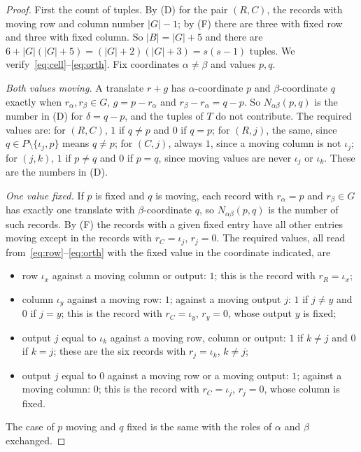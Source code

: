 \documentclass[11pt]{amsart}
\theoremstyle{definition}\newtheorem{definition}[theorem]{Definition}
\theoremstyle{remark}\newtheorem{remark}[theorem]{Remark}
\begin{document}
\begin{proof}
First the count of tuples. By (D) for the pair $(R,C)$, the records with moving row and column number $|G|-1$; by (F)
there are three with fixed row and three with fixed column. So $|B|=|G|+5$ and there are
$6+|G|(|G|+5)=(|G|+2)(|G|+3)=s(s-1)$ tuples. We verify~\eqref{eq:cell}--\eqref{eq:orth}. Fix coordinates
$\alpha\ne\beta$ and values $p,q$.

\emph{Both values moving.} A translate $r+g$ has $\alpha$-coordinate $p$ and $\beta$-coordinate $q$ exactly when
$r_\alpha,r_\beta\in G$, $g=p-r_\alpha$ and $r_\beta-r_\alpha=q-p$. So $N_{\alpha\beta}(p,q)$ is the number in (D) for
$\delta=q-p$, and the tuples of $T$ do not contribute. The required values are: for $(R,C)$, $1$ if $q\ne p$ and $0$ if
$q=p$; for $(R,j)$, the same, since $q\in P\setminus\{\iota_j,p\}$ means $q\ne p$; for $(C,j)$, always $1$, since a
moving column is not $\iota_j$; for $(j,k)$, $1$ if $p\ne q$ and $0$ if $p=q$, since moving values are never
$\iota_j$ or $\iota_k$. These are the numbers in (D).

\emph{One value fixed.} If $p$ is fixed and $q$ is moving, each record with $r_\alpha=p$ and $r_\beta\in G$ has exactly
one translate with $\beta$-coordinate $q$, so $N_{\alpha\beta}(p,q)$ is the number of such records. By (F) the
records with a given fixed entry have all other entries moving except in the records with $r_C=\iota_j$, $r_j=0$. The
required values, all read from~\eqref{eq:row}--\eqref{eq:orth} with the fixed value in the coordinate indicated, are
\begin{itemize}
\item row $\iota_x$ against a moving column or output: $1$; this is the record with $r_R=\iota_x$;
\item column $\iota_y$ against a moving row: $1$; against a moving output $j$: $1$ if $j\ne y$ and $0$ if $j=y$; this is
the record with $r_C=\iota_y$, $r_y=0$, whose output $y$ is fixed;
\item output $j$ equal to $\iota_k$ against a moving row, column or output: $1$ if $k\ne j$ and $0$ if $k=j$; these are
the six records with $r_j=\iota_k$, $k\ne j$;
\item output $j$ equal to $0$ against a moving row or a moving output: $1$; against a moving column: $0$; this is the
record with $r_C=\iota_j$, $r_j=0$, whose column is fixed.
\end{itemize}
The case of $p$ moving and $q$ fixed is the same with the roles of $\alpha$ and $\beta$ exchanged.


\end{proof}
\end{document}
